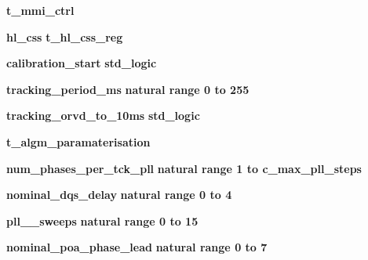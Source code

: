\begin{DoxyCompactItemize}
{\bf t\+\_\+mmi\+\_\+ctrl} {\bfseries  }
\item 
{\bf hl\+\_\+css} {\bfseries {\bfseries {\bfseries {\bf t\+\_\+hl\+\_\+css\+\_\+reg}} \textcolor{vhdlchar}{ }}} 
\item 
{\bf calibration\+\_\+start} {\bfseries {\bfseries \textcolor{comment}{std\+\_\+logic}\textcolor{vhdlchar}{ }}} 
\item 
{\bf tracking\+\_\+period\+\_\+ms} {\bfseries {\bfseries \textcolor{comment}{natural}\textcolor{vhdlchar}{ }\textcolor{vhdlchar}{ }\textcolor{vhdlchar}{ }\textcolor{keywordflow}{range}\textcolor{vhdlchar}{ }\textcolor{vhdlchar}{ } \textcolor{vhdldigit}{0} \textcolor{vhdlchar}{ }\textcolor{keywordflow}{to}\textcolor{vhdlchar}{ }\textcolor{vhdlchar}{ } \textcolor{vhdldigit}{255} \textcolor{vhdlchar}{ }}} 
\item 
{\bf tracking\+\_\+orvd\+\_\+to\+\_\+10ms} {\bfseries {\bfseries \textcolor{comment}{std\+\_\+logic}\textcolor{vhdlchar}{ }}} 
\item 
{\bf t\+\_\+algm\+\_\+paramaterisation} {\bfseries  }
\item 
{\bf num\+\_\+phases\+\_\+per\+\_\+tck\+\_\+pll} {\bfseries {\bfseries \textcolor{comment}{natural}\textcolor{vhdlchar}{ }\textcolor{vhdlchar}{ }\textcolor{vhdlchar}{ }\textcolor{keywordflow}{range}\textcolor{vhdlchar}{ }\textcolor{vhdlchar}{ } \textcolor{vhdldigit}{1} \textcolor{vhdlchar}{ }\textcolor{keywordflow}{to}\textcolor{vhdlchar}{ }\textcolor{vhdlchar}{ }\textcolor{vhdlchar}{ }\textcolor{vhdlchar}{ }{\bfseries {\bf c\+\_\+max\+\_\+pll\+\_\+steps}} \textcolor{vhdlchar}{ }}} 
\item 
{\bf nominal\+\_\+dqs\+\_\+delay} {\bfseries {\bfseries \textcolor{comment}{natural}\textcolor{vhdlchar}{ }\textcolor{vhdlchar}{ }\textcolor{vhdlchar}{ }\textcolor{keywordflow}{range}\textcolor{vhdlchar}{ }\textcolor{vhdlchar}{ } \textcolor{vhdldigit}{0} \textcolor{vhdlchar}{ }\textcolor{keywordflow}{to}\textcolor{vhdlchar}{ }\textcolor{vhdlchar}{ } \textcolor{vhdldigit}{4} \textcolor{vhdlchar}{ }}} 
\item 
{\bf pll\+\_\+\_\+sweeps} {\bfseries {\bfseries \textcolor{comment}{natural}\textcolor{vhdlchar}{ }\textcolor{vhdlchar}{ }\textcolor{vhdlchar}{ }\textcolor{keywordflow}{range}\textcolor{vhdlchar}{ }\textcolor{vhdlchar}{ } \textcolor{vhdldigit}{0} \textcolor{vhdlchar}{ }\textcolor{keywordflow}{to}\textcolor{vhdlchar}{ }\textcolor{vhdlchar}{ } \textcolor{vhdldigit}{15} \textcolor{vhdlchar}{ }}} 
\item 
{\bf nominal\+\_\+poa\+\_\+phase\+\_\+lead} {\bfseries {\bfseries \textcolor{comment}{natural}\textcolor{vhdlchar}{ }\textcolor{vhdlchar}{ }\textcolor{vhdlchar}{ }\textcolor{keywordflow}{range}\textcolor{vhdlchar}{ }\textcolor{vhdlchar}{ } \textcolor{vhdldigit}{0} \textcolor{vhdlchar}{ }\textcolor{keywordflow}{to}\textcolor{vhdlchar}{ }\textcolor{vhdlchar}{ } \textcolor{vhdldigit}{7} \textcolor{vhdlchar}{ }}} 

\end{DoxyCompactItemize}
